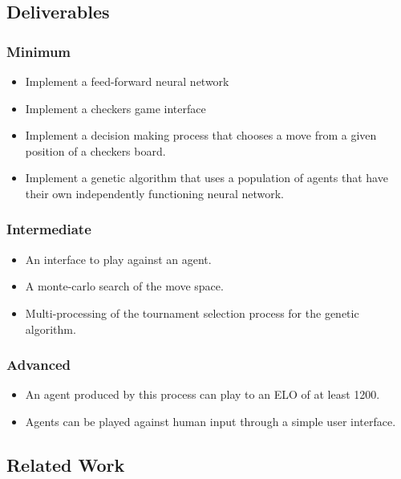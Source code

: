 \documentclass[12pt,a4paper]{article}
\begin{document}
\subsection*{Deliverables}

    \subsubsection*{Minimum}

    \begin{itemize}
    \item Implement a feed-forward neural network
    \item Implement a checkers game interface
    \item Implement a decision making process that chooses a move from a given position of a checkers board.
    \item Implement a genetic algorithm that uses a population of agents that have their own independently functioning neural network.
    \end{itemize}

    \subsubsection*{Intermediate}

    \begin{itemize}
    \item An interface to play against an agent.
    \item A monte-carlo search of the move space.
    \item Multi-processing of the tournament selection process for the genetic algorithm.
    \end{itemize}

    \subsubsection*{Advanced}

    \begin{itemize}
    \item An agent produced by this process can play to an ELO of at least 1200.
    \item Agents can be played against human input through a simple user interface.
    \end{itemize}

\subsection*{Related Work}
\end{document}
